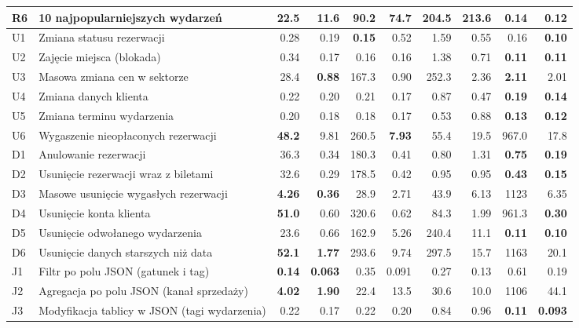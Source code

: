 \begin{tabular}{llrrrrrrrr}
R6 & 10 najpopularniejszych wydarzeń & \num{22.5} & \num{11.6} & \num{90.2} & \num{74.7} & \num{204.5} & \num{213.6} & \textbf{\num{0.14}} & \textbf{\num{0.12}} \\
\midrule
U1 & Zmiana statusu rezerwacji & \num{0.28} & \num{0.19} & \textbf{\num{0.15}} & \num{0.52} & \num{1.59} & \num{0.55} & \num{0.16} & \textbf{\num{0.10}} \\
U2 & Zajęcie miejsca (blokada) & \num{0.34} & \num{0.17} & \num{0.16} & \num{0.16} & \num{1.38} & \num{0.71} & \textbf{\num{0.11}} & \textbf{\num{0.11}} \\
U3 & Masowa zmiana cen w sektorze & \num{28.4} & \textbf{\num{0.88}} & \num{167.3} & \num{0.90} & \num{252.3} & \num{2.36} & \textbf{\num{2.11}} & \num{2.01} \\
U4 & Zmiana danych klienta & \num{0.22} & \num{0.20} & \num{0.21} & \num{0.17} & \num{0.87} & \num{0.47} & \textbf{\num{0.19}} & \textbf{\num{0.14}} \\
U5 & Zmiana terminu wydarzenia & \num{0.20} & \num{0.18} & \num{0.18} & \num{0.17} & \num{0.53} & \num{0.88} & \textbf{\num{0.13}} & \textbf{\num{0.12}} \\
U6 & Wygaszenie nieopłaconych rezerwacji & \textbf{\num{48.2}} & \num{9.81} & \num{260.5} & \textbf{\num{7.93}} & \num{55.4} & \num{19.5} & \num{967.0} & \num{17.8} \\
\midrule
D1 & Anulowanie rezerwacji & \num{36.3} & \num{0.34} & \num{180.3} & \num{0.41} & \num{0.80} & \num{1.31} & \textbf{\num{0.75}} & \textbf{\num{0.19}} \\
D2 & Usunięcie rezerwacji wraz z biletami & \num{32.6} & \num{0.29} & \num{178.5} & \num{0.42} & \num{0.95} & \num{0.95} & \textbf{\num{0.43}} & \textbf{\num{0.15}} \\
D3 & Masowe usunięcie wygasłych rezerwacji & \textbf{\num{4.26}} & \textbf{\num{0.36}} & \num{28.9} & \num{2.71} & \num{43.9} & \num{6.13} & \num{1123} & \num{6.35} \\
D4 & Usunięcie konta klienta & \textbf{\num{51.0}} & \num{0.60} & \num{320.6} & \num{0.62} & \num{84.3} & \num{1.99} & \num{961.3} & \textbf{\num{0.30}} \\
D5 & Usunięcie odwołanego wydarzenia & \num{23.6} & \num{0.66} & \num{162.9} & \num{5.26} & \num{240.4} & \num{11.1} & \textbf{\num{0.11}} & \textbf{\num{0.10}} \\
D6 & Usunięcie danych starszych niż data & \textbf{\num{52.1}} & \textbf{\num{1.77}} & \num{293.6} & \num{9.74} & \num{297.5} & \num{15.7} & \num{1163} & \num{20.1} \\
\midrule
J1 & Filtr po polu JSON (gatunek i tag) & \textbf{\num{0.14}} & \textbf{\num{0.063}} & \num{0.35} & \num{0.091} & \num{0.27} & \num{0.13} & \num{0.61} & \num{0.19} \\
J2 & Agregacja po polu JSON (kanał sprzedaży) & \textbf{\num{4.02}} & \textbf{\num{1.90}} & \num{22.4} & \num{13.5} & \num{30.6} & \num{10.0} & \num{1106} & \num{44.1} \\
J3 & Modyfikacja tablicy w JSON (tagi wydarzenia) & \num{0.22} & \num{0.17} & \num{0.22} & \num{0.20} & \num{0.84} & \num{0.96} & \textbf{\num{0.11}} & \textbf{\num{0.093}} \\
\bottomrule
\end{tabular}
